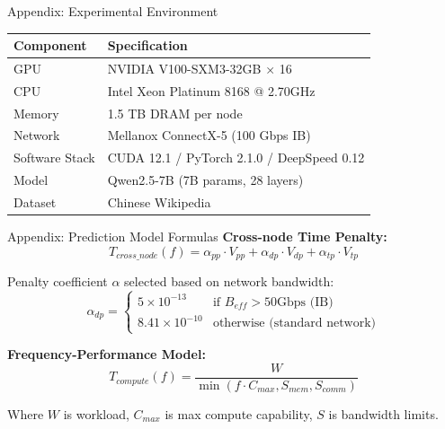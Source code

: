 \documentclass[aspectratio=169,10pt]{beamer}
\begin{document}
\appendix

\begin{frame}{Appendix: Experimental Environment}
\begin{table}
\centering
\small
\begin{tabular}{ll}
\toprule
\textbf{Component} & \textbf{Specification} \\
\midrule
GPU & NVIDIA V100-SXM3-32GB × 16 \\
CPU & Intel Xeon Platinum 8168 @ 2.70GHz \\
Memory & 1.5 TB DRAM per node \\
Network & Mellanox ConnectX-5 (100 Gbps IB) \\
\midrule
Software Stack & CUDA 12.1 / PyTorch 2.1.0 / DeepSpeed 0.12 \\
Model & Qwen2.5-7B (7B params, 28 layers) \\
Dataset & Chinese Wikipedia \\
\bottomrule
\end{tabular}
\end{table}
\end{frame}

\begin{frame}{Appendix: Prediction Model Formulas}
\textbf{Cross-node Time Penalty:}
\[
T_{cross\_node}(f) = \alpha_{pp} \cdot V_{pp} + \alpha_{dp} \cdot V_{dp} + \alpha_{tp} \cdot V_{tp}
\]

Penalty coefficient $\alpha$ selected based on network bandwidth:
\[
\alpha_{dp} = \begin{cases}
5 \times 10^{-13} & \text{if } B_{eff} > 50\text{Gbps (IB)} \\
8.41 \times 10^{-10} & \text{otherwise (standard network)}
\end{cases}
\]
\vspace{0.3cm}

\textbf{Frequency-Performance Model:}
\[
T_{compute}(f) = \frac{W}{\min(f \cdot C_{max}, S_{mem}, S_{comm})}
\]

Where $W$ is workload, $C_{max}$ is max compute capability, $S$ is bandwidth limits.
\end{frame}
\end{document}
